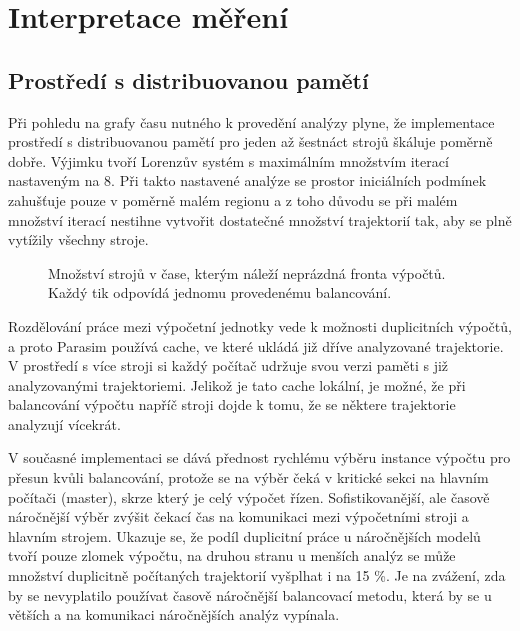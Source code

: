 \section{Interpretace měření}

\subsection{Prostředí s distribuovanou pamětí}

Při pohledu na grafy času nutného k provedění analýzy plyne, že implementace
prostředí s distribuovanou pamětí pro jeden až šestnáct strojů šká\-lu\-je poměrně dobře. Výjimku tvoří
Lorenzův systém s maximálním množ\-stvím iterací nastaveným na 8. Při takto nastavené analýze
se prostor ini\-ci\-ál\-ních podmínek zahušťuje pouze v poměrně malém regionu a z toho důvodu se při
malém množství iterací nestihne vytvořit dostatečné množství trajektorií tak, aby se plně
vytížily všechny stroje. 

\begin{figure}[h!]
\begin{center}
\caption{Množství strojů v čase, kterým náleží neprázdná fronta výpočtů. Každý tik odpovídá jednomu provedenému balancování.}
\end{center}
\end{figure}

Rozdělování práce mezi výpočetní jednotky vede k možnosti du\-pli\-cit\-ních výpočtů,
a proto Parasim používá cache, ve které ukládá již dříve analyzované trajektorie.
V prostředí s více stroji si každý počítač udržuje svou verzi paměti s již
analyzovanými trajektoriemi. Jelikož je tato cache lokální, je možné, že při balancování
výpočtu napříč stroji dojde k tomu, že se některe trajektorie analyzují vícekrát.

V současné implementaci se dává přednost rychlému výběru instance výpočtu pro
přesun kvůli balancování, protože se na výběr čeká v kritické sekci na hlavním
počítači (master), skrze který je celý výpočet řízen. Sofistikovanější, ale časově
náročnější výběr zvýšit čekací čas na komunikaci mezi výpočetními stroji a hlavním strojem.
Ukazuje se, že podíl duplicitní práce u náročnějších modelů tvoří pouze zlomek výpočtu,
na druhou stranu u menších analýz se může množství duplicitně počítaných trajektorií
vyšplhat i na 15 \%. Je na zvážení, zda by se nevyplatilo používat časově náročnější
balancovací metodu, která by se u větších a na komunikaci náročnějších analýz vypínala.

